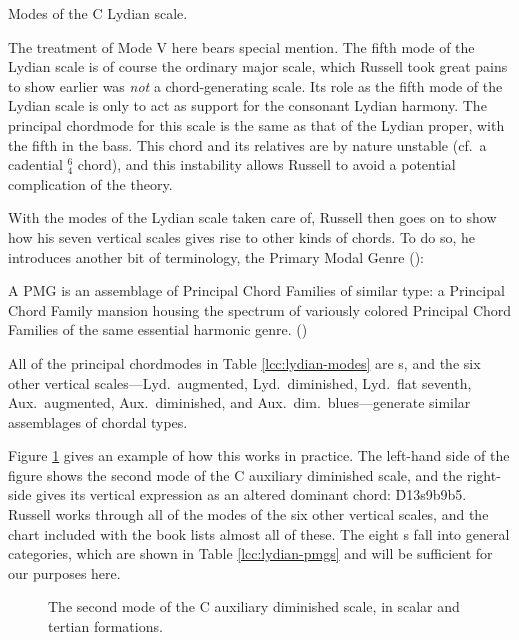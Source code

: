 \begin{table}[tbp]
  \caption{Modes of the C Lydian scale.}
  \label{lcc:lydian-modes}
\end{table}

The treatment of Mode V here bears special mention. The fifth mode of the
Lydian scale is of course the ordinary major scale, which Russell took great
pains to show earlier was \emph{not} a chord-generating scale. Its
role as the fifth mode of the Lydian scale is only to act as support for the
consonant Lydian harmony. The principal chordmode for this scale is the same
as that of the Lydian proper, with the fifth in the bass. This chord and its
relatives are by nature unstable (cf.\ a cadential $^6_4$ chord), and this
instability allows Russell to avoid a potential complication of the theory.

With the modes of the Lydian scale taken care of, Russell then goes on to show
how his seven vertical scales gives rise to other kinds of chords. To do so,
he introduces another bit of terminology, the Primary Modal Genre
():%
%
\begin{quoting}
  \singlespacing
  A PMG is an assemblage of Principal Chord Families of similar type: a
  Principal Chord Family mansion housing the spectrum of variously colored
  Principal Chord Families of the same essential harmonic
  genre. ()
\end{quoting}
%
\noindent All of the principal chordmodes in Table \ref{lcc:lydian-modes} are
s, and the six other vertical scales---Lyd.\ augmented, Lyd.\
diminished, Lyd.\ flat seventh, Aux.\ augmented, Aux.\ diminished, and Aux.\
dim.\ blues---generate similar assemblages of chordal types.

Figure \ref{lcc:alternate-pmg} gives an example of how this works in practice.
The left-hand side of the figure shows the second mode of the C auxiliary
diminished scale, and the right-side gives its vertical expression as an
altered dominant chord: \h{D13s9b9b5}. Russell works through all of the modes
of the six other vertical scales, and the chart included with the book lists
almost all of these. The eight \abbrev{PMG}s fall into general categories,
which are shown in Table \ref{lcc:lydian-pmgs} and will be sufficient for our
purposes here.\fn{lcc-20}

\begin{figure}[tbp]
  \caption{The second mode of the C auxiliary diminished scale, in scalar and
    tertian formations.}
  \label{lcc:alternate-pmg}
\end{figure}

